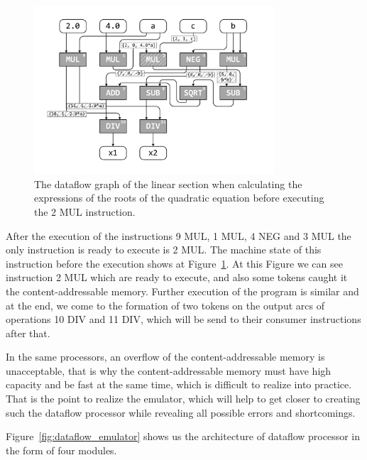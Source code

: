\documentclass[
11pt,%
tightenlines,%
twoside,%
onecolumn,%
nofloats,%
nobibnotes,%
nofootinbib,%
superscriptaddress,%
noshowpacs,%
centertags]%
{revtex4}
\begin{document}
\begin{figure}[h]
\setcaptionmargin{5mm}
\onelinecaptionsfalse %
\includegraphics[width=0.80\textwidth]{pics/dataflow2.pdf}
\caption{The dataflow graph of the linear section when calculating the expressions of the roots of the quadratic equation before executing the 2 MUL instruction.}\label{fig:dataflow2}
\end{figure}

After the execution of the instructions 9 MUL, 1 MUL, 4 NEG and 3 MUL the only instruction is ready to execute is 2 MUL.
The machine state of this instruction before the execution shows at Figure~\ref{fig:dataflow2}.
At this Figure we can see instruction 2 MUL which are ready to execute, and also some tokens caught it the content-addressable memory.
Further execution of the program is similar and at the end, we come to the formation of two tokens on the output arcs of operations 10 DIV and 11 DIV, which will be send to their consumer instructions after that.

In the same processors, an overflow of the content-addressable memory is unacceptable, that is why the content-addressable memory must have high capacity and be fast at the same time, which is difficult to realize into practice.
That is the point to realize the emulator, which will help to get closer to creating such the dataflow processor while revealing all possible errors and shortcomings.

Figure~\ref{fig:dataflow_emulator} shows us the architecture of dataflow processor in the form of four modules.
\end{document}
